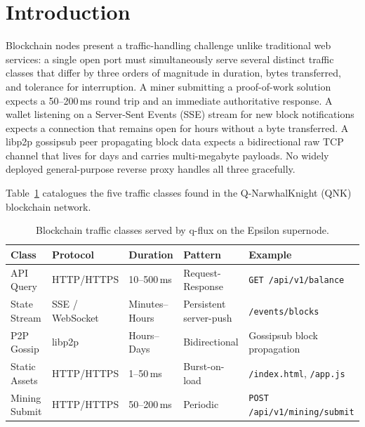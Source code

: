\documentclass[a4paper, 11pt]{article}
\begin{document}
\tableofcontents
\newpage

\section{Introduction}
\label{sec:intro}

Blockchain nodes present a traffic-handling challenge unlike traditional web
services: a single open port must simultaneously serve several distinct traffic
classes that differ by three orders of magnitude in duration, bytes transferred,
and tolerance for interruption.  A miner submitting a proof-of-work solution
expects a 50--200\,ms round trip and an immediate authoritative response.  A
wallet listening on a Server-Sent Events (SSE) stream for new block notifications
expects a connection that remains open for hours without a byte transferred.  A
libp2p gossipsub peer propagating block data expects a bidirectional raw TCP
channel that lives for days and carries multi-megabyte payloads.  No widely
deployed general-purpose reverse proxy handles all three gracefully.

Table~\ref{tab:traffic-classes} catalogues the five traffic classes found in
the Q-NarwhalKnight (QNK) blockchain network.

\begin{table}[t]
\centering
\caption{Blockchain traffic classes served by q-flux on the Epsilon supernode.}
\label{tab:traffic-classes}
\begin{tabular}{lllll}
\toprule
\textbf{Class}   & \textbf{Protocol}   & \textbf{Duration}    & \textbf{Pattern}         & \textbf{Example} \\
\midrule
API Query        & HTTP/HTTPS          & 10--500\,ms          & Request-Response         & \texttt{GET /api/v1/balance} \\
State Stream     & SSE / WebSocket     & Minutes--Hours       & Persistent server-push   & \texttt{/events/blocks} \\
P2P Gossip       & libp2p              & Hours--Days          & Bidirectional            & Gossipsub block propagation \\
Static Assets    & HTTP/HTTPS          & 1--50\,ms            & Burst-on-load            & \texttt{/index.html}, \texttt{/app.js} \\
Mining Submit    & HTTP/HTTPS          & 50--200\,ms          & Periodic                 & \texttt{POST /api/v1/mining/submit} \\
\bottomrule
\end{tabular}
\end{table}
\end{document}
